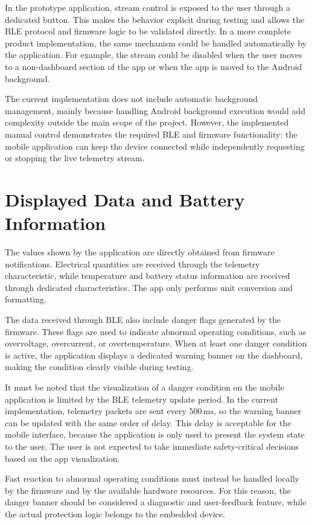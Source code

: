 In the prototype application, stream control is exposed to the user through a dedicated button. 
This makes the behavior explicit during testing and allows the BLE protocol and firmware logic to be validated directly. 
In a more complete product implementation, the same mechanism could be handled automatically by the application. 
For example, the stream could be disabled when the user moves to a non-dashboard section of the app or when the app is moved to the Android background.

The current implementation does not include automatic background management, mainly because handling Android background execution would add complexity outside the main scope of the project. 
However, the implemented manual control demonstrates the required BLE and firmware functionality: the mobile application can keep the device connected while independently requesting or stopping the live telemetry stream.

\section{Displayed Data and Battery Information}
\label{sec:app_displayed_data}

The values shown by the application are directly obtained from firmware notifications. Electrical quantities are received through the telemetry characteristic, while temperature and battery status information are received through dedicated characteristics. The app only performs unit conversion and formatting.

The data received through BLE also include danger flags generated by the firmware. 
These flags are used to indicate abnormal operating conditions, such as overvoltage, overcurrent, or overtemperature. 
When at least one danger condition is active, the application displays a dedicated warning banner on the dashboard, making the condition clearly visible during testing.

It must be noted that the visualization of a danger condition on the mobile application is limited by the BLE telemetry update period. 
In the current implementation, telemetry packets are sent every \(500\,\mathrm{ms}\), so the warning banner can be updated with the same order of delay. 
This delay is acceptable for the mobile interface, because the application is only used to present the system state to the user. 
The user is not expected to take immediate safety-critical decisions based on the app visualization.

Fast reaction to abnormal operating conditions must instead be handled locally by the firmware and by the available hardware resources. 
For this reason, the danger banner should be considered a diagnostic and user-feedback feature, while the actual protection logic belongs to the embedded device.

